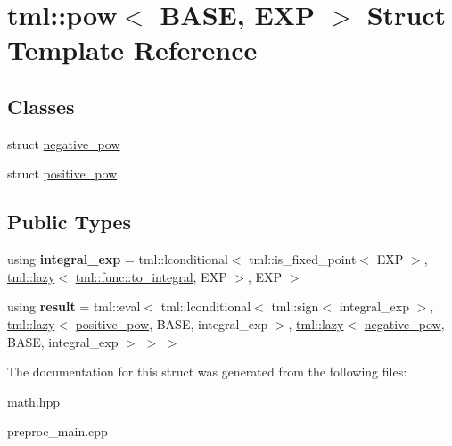 \hypertarget{structtml_1_1pow}{\section{tml\+:\+:pow$<$ B\+A\+S\+E, E\+X\+P $>$ Struct Template Reference}
\label{structtml_1_1pow}
}
\subsection*{Classes}
\begin{DoxyCompactItemize}
\item 
struct \hyperlink{structtml_1_1pow_1_1negative__pow}{negative\+\_\+pow}
\item 
struct \hyperlink{structtml_1_1pow_1_1positive__pow}{positive\+\_\+pow}
\end{DoxyCompactItemize}
\subsection*{Public Types}
\begin{DoxyCompactItemize}
\item 
\hypertarget{structtml_1_1pow_a22aa7461dd7957a92f05fe4d77e70941}{using {\bfseries integral\+\_\+exp} = tml\+::lconditional$<$ tml\+::is\+\_\+fixed\+\_\+point$<$ E\+X\+P $>$, \hyperlink{structtml_1_1lazy}{tml\+::lazy}$<$ \hyperlink{structtml_1_1impl_1_1to__integral}{tml\+::func\+::to\+\_\+integral}, E\+X\+P $>$, E\+X\+P $>$}\label{structtml_1_1pow_a22aa7461dd7957a92f05fe4d77e70941}

\item 
\hypertarget{structtml_1_1pow_ae1a36ee1bfb11e5f308f257cf1c9a86b}{using {\bfseries result} = tml\+::eval$<$ tml\+::lconditional$<$ tml\+::sign$<$ integral\+\_\+exp $>$, \hyperlink{structtml_1_1lazy}{tml\+::lazy}$<$ \hyperlink{structtml_1_1pow_1_1positive__pow}{positive\+\_\+pow}, B\+A\+S\+E, integral\+\_\+exp $>$, \hyperlink{structtml_1_1lazy}{tml\+::lazy}$<$ \hyperlink{structtml_1_1pow_1_1negative__pow}{negative\+\_\+pow}, B\+A\+S\+E, integral\+\_\+exp $>$ $>$ $>$}\label{structtml_1_1pow_ae1a36ee1bfb11e5f308f257cf1c9a86b}

\end{DoxyCompactItemize}


The documentation for this struct was generated from the following files\+:\begin{DoxyCompactItemize}
\item 
math.\+hpp\item 
preproc\+\_\+main.\+cpp\end{DoxyCompactItemize}
